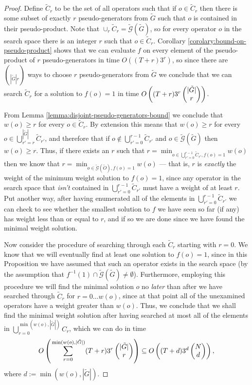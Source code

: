 \documentclass[twocolumn,showpacs,preprintnumbers,amsmath,amssymb,nofootinbib,pra,floatfix]{revtex4-1}
\newcommand{\set}{\tilde}
\newcommand{\genfun}{\tilde{\mathcal{G}}}
\begin{document}
\begin{proof}
Define $\set C_r$ to be the set of all operators such that if $o\in\set C_r$ then there is some subset of exactly $r$ pseudo-generators from $\set G$ such that $o$ is contained in their pseudo-product.  Note that $\cup_r \set C_r = \genfun(\set G)$, so for every operator $o$ in the search space there is an integer $r$ such that $o\in\set C_r$.  Corollary \ref{corolary:bound-on-pseudo-product} shows that we can evaluate $f$ on every element of the pseudo-product of $r$ pseudo-generators in time $O((T+r)3^r)$, so since there are $\choose{|\set G|}{r}$ ways to choose $r$ pseudo-generators from $\set G$ we conclude that we can search $\set C_r$ for a solution to $f(o)=1$ in time $O\paren{(T+r) 3^r \choose{|\set G|}{r}}$.

From Lemma \ref{lemma:disjoint-pseudo-generators-bound} we conclude that $w(o)\ge r$ for every $o\in\set C_r$.  By extension this means that $w(o)\ge r$ for every $o\in\bigcup_{r'=r}^{|\set G|}\set C_{r'}$, and therefore that if $o\notin\bigcup_{r'=0}^{r-1}\set C_{r'}$ and $o\in\genfun(\set G)$ then $w(o)\ge r$.  Thus, if there exists an $r$ such that $r=\min_{o\in\bigcup_{r'=0}^{r-1}\set C_{r'},f(o)=1}w(o)$ then we know that $r=\min_{o\in\genfun(\set O),f(o)=1}w(o)$ --- that is, $r$ is \emph{exactly} the weight of the minimum weight solution to $f(o)=1$, since any operator in the search space that \emph{isn't} contained in $\bigcup_{r'=0}^{r-1}\set C_{r'}$ must have a weight of at least $r$.  Put another way, after having enumerated all of the elements in $\bigcup_{r'=0}^{r-1}\set C_{r'}$ we can check to see whether the smallest solution to $f$ we have seen so far (if any) has weight less than or equal to $r$, and if so we are done since we have found the minimal weight solution.

Now consider the procedure of searching through each $\set C_r$ starting with $r=0$.  We know that we will eventually find at least one solution to $f(o)=1$, since in this Proposition we have assumed that such an operator exists in the search space (by the assumption that $f^{-1}(1)\cap\genfun(\set G)\ne\emptyset$).  Furthermore, employing this procedure we will find the minimal solution $o$ no \emph{later} than after we have searched through $\set C_r$ for $r=0\dots w(o)$, since at that point all of the unexamined operators have a weight greater than $w(o)$.  Thus, we conclude that we shall find the minimal weight solution after having searched at most all of the elements in $\bigcup_{r=0}^{\min(w(o),|\set G|)} C_r$, which we can do in time $$O\paren{\sum_{r=0}^{\min(w(o),|\set G|)}(T+r) 3^r \choose{|\set G|}{r}}\subseteq O\paren{(T+d) 3^d \choose{N}{d}},$$ where $d:=\min(w(o),|\set G|)$.
\end{proof}
\end{document}
